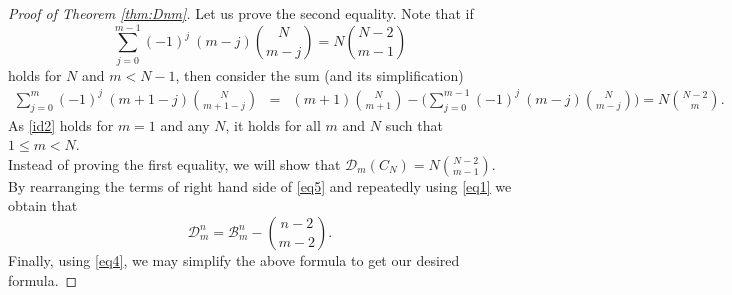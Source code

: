 \documentclass[10pt, reqno]{amsart}
\newcommand{\bgd}{\begin{displaymath}}
\newcommand{\edd}{\end{displaymath}}
\newcommand{\hf}{\hspace*{0.5cm}}
\theoremstyle{plain}
\theoremstyle{remark}
\def\D{\mathcal D}
\def\B{\mathcal B}
\theoremstyle{definition}
\numberwithin{equation}{section}
\begin{document}
\begin{proof}[Proof of Theorem \ref{thm:Dnm}]
Let us prove the second equality. Note that if 
\begin{equation}
\sum_{j=0}^{m-1} (-1)^{j}~ (m-j) {N \choose m-j}=N  {N-2 \choose m-1}\label{id2}
\end{equation}
holds for $N$ and $m<N-1$, then consider the sum (and its simplification)
\begin{eqnarray*}
\sum_{j=0}^{m} (-1)^{j}~ (m+1-j) {N \choose m+1-j} & = & (m+1){N \choose m+1}-\bigg(\sum_{j=0}^{m-1} (-1)^{j}~ (m-j) {N \choose m-j}\bigg) =N {N-2 \choose m}.
\end{eqnarray*}
As \eqref{id2} holds for $m=1$ and any $N$, it holds for all $m$ and $N$ such that $1\leq m<N$. \\
\hf Instead of proving the first equality, we will show that $\mathcal{D}_m(C_N)=N {N-2 \choose m-1}$. By rearranging the terms of right hand side of \eqref{eq5} and repeatedly using \eqref{eq1} we obtain that
\bgd
\D^n_m = \B^n_m - {n-2 \choose m-2}.
\edd
Finally, using \eqref{eq4}, we may simplify the above formula to get our desired formula.
\end{proof}

\printbibliography
\end{document}
